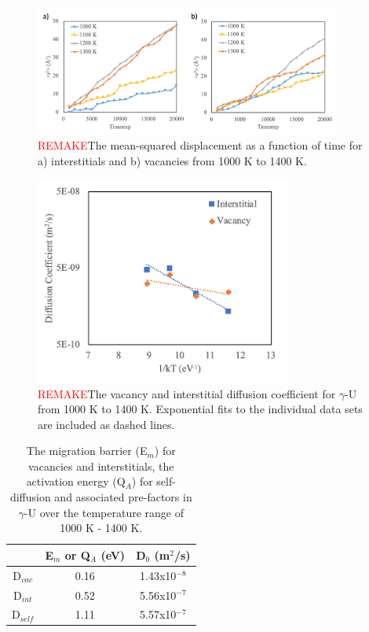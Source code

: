 \documentclass[review]{elsarticle}
\begin{document}
 \begin{figure}[h]
 \centering
 \includegraphics[width=0.9\textwidth]{msd.png} 
 \caption{\textcolor{red}{REMAKE}The mean-squared displacement as a function of time for a) interstitials and b) vacancies from 1000 K to 1400 K.  }
 \label{fig:rsquare}
\end{figure}

 \begin{figure}[h]
 \centering
 \includegraphics[width=0.75\textwidth]{diff.png} 
 \caption{\textcolor{red}{REMAKE}The vacancy and interstitial diffusion coefficient for $\gamma$-U from 1000 K to 1400 K. Exponential fits to the individual data sets are included as dashed lines.}
 \label{fig:diff}
\end{figure}

\FloatBarrier

\begin{table}[h]
\caption{The migration barrier (E$_m$) for vacancies and interstitials, the activation energy (Q$_A$) for self-diffusion and associated pre-factors in $\gamma$-U over the temperature range of 1000 K - 1400 K.}  \label{tab:diff}
\begin{center}
\begin{tabular}{|c|c|c|}
	\hline
	 & E$_m$ or Q$_A$ (eV) & D$_0$ (m$^2$/s) \\
	 \hline
	 D$_{vac}$ & 0.16 & 1.43x10$^{-8}$ \\
	 D$_{int}$ & 0.52 & 5.56x10$^{-7}$ \\
	 D$_{self}$ & 1.11 & 5.57x10$^{-7}$ \\
	 \hline
\end{tabular}
\end{center}
\label{default}
\end{table}
\end{document}
